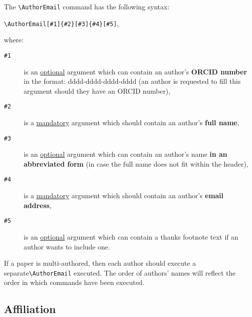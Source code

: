 \documentclass[manuscript]{BSLstyle} %
\begin{document}
The \texttt{\textbackslash AuthorEmail} command has the following syntax:
\begin{center}
\texttt{\textbackslash AuthorEmail[\#1]\{\#2\}[\#3]\{\#4\}[\#5]},
\end{center}
where:
\begin{description}
\item[\texttt{\#1}] is an \underline{optional} argument which can contain an author's \textbf{ORCID number} in the format: dddd-dddd-dddd-dddd (an author is requested to fill this argument should they have an ORCID number),
\item[\texttt{\#2}] is a \underline{mandatory} argument which should contain an author's \textbf{full name},
\item[\texttt{\#3}] is an \underline{optional} argument which can contain an author's name \textbf{in an abbreviated form} (in case the full name does not fit within the header),
\item[\texttt{\#4}] is a \underline{mandatory} argument which should contain an author's \textbf{email address},
\item[\texttt{\#5}] is an \underline{optional} argument which can contain a thanks footnote text if an author wants to include one.
\end{description}
If a paper is multi-authored, then each author should execute a separate\linebreak \texttt{\textbackslash AuthorEmail} executed. The order of authors' names will reflect the order in which commands have been executed.

\subsection{Affiliation}
\end{document}
